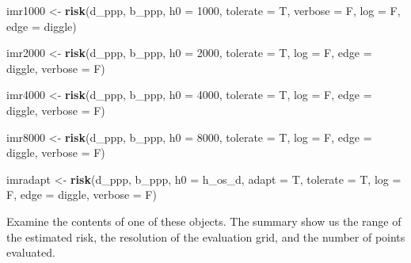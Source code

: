 \documentclass[
]{book}
\newenvironment{Shaded}{\begin{snugshade}}{\end{snugshade}}
\newcommand{\AttributeTok}[1]{\textcolor[rgb]{0.13,0.29,0.53}{#1}}
\newcommand{\DecValTok}[1]{\textcolor[rgb]{0.00,0.00,0.81}{#1}}
\newcommand{\FunctionTok}[1]{\textcolor[rgb]{0.13,0.29,0.53}{\textbf{#1}}}
\newcommand{\NormalTok}[1]{#1}
\newcommand{\OtherTok}[1]{\textcolor[rgb]{0.56,0.35,0.01}{#1}}
\newcommand{\StringTok}[1]{\textcolor[rgb]{0.31,0.60,0.02}{#1}}
\begin{document}
\begin{Shaded}
\begin{Highlighting}[]
\NormalTok{imr1000 }\OtherTok{\textless{}{-}} \FunctionTok{risk}\NormalTok{(d\_ppp, b\_ppp, }\AttributeTok{h0 =} \DecValTok{1000}\NormalTok{, }
            \AttributeTok{tolerate =}\NormalTok{ T,}
            \AttributeTok{verbose =}\NormalTok{ F, }
            \AttributeTok{log =}\NormalTok{ F,}
            \AttributeTok{edge =} \StringTok{\textquotesingle{}diggle\textquotesingle{}}\NormalTok{)}

\NormalTok{imr2000 }\OtherTok{\textless{}{-}} \FunctionTok{risk}\NormalTok{(d\_ppp, b\_ppp, }\AttributeTok{h0 =} \DecValTok{2000}\NormalTok{, }
            \AttributeTok{tolerate =}\NormalTok{ T,}
            \AttributeTok{log =}\NormalTok{ F,}
            \AttributeTok{edge =} \StringTok{\textquotesingle{}diggle\textquotesingle{}}\NormalTok{,}
            \AttributeTok{verbose =}\NormalTok{ F)}

\NormalTok{imr4000 }\OtherTok{\textless{}{-}} \FunctionTok{risk}\NormalTok{(d\_ppp, b\_ppp, }\AttributeTok{h0 =} \DecValTok{4000}\NormalTok{, }
            \AttributeTok{tolerate =}\NormalTok{ T,}
            \AttributeTok{log =}\NormalTok{ F,}
            \AttributeTok{edge =} \StringTok{\textquotesingle{}diggle\textquotesingle{}}\NormalTok{,}
            \AttributeTok{verbose =}\NormalTok{ F)}

\NormalTok{imr8000 }\OtherTok{\textless{}{-}} \FunctionTok{risk}\NormalTok{(d\_ppp, b\_ppp, }\AttributeTok{h0 =} \DecValTok{8000}\NormalTok{, }
            \AttributeTok{tolerate =}\NormalTok{ T,}
            \AttributeTok{log =}\NormalTok{ F,}
            \AttributeTok{edge =} \StringTok{\textquotesingle{}diggle\textquotesingle{}}\NormalTok{,}
            \AttributeTok{verbose =}\NormalTok{ F)}

\NormalTok{imradapt }\OtherTok{\textless{}{-}} \FunctionTok{risk}\NormalTok{(d\_ppp, b\_ppp, }
                 \AttributeTok{h0 =}\NormalTok{ h\_os\_d, }
                 \AttributeTok{adapt =}\NormalTok{ T, }
                 \AttributeTok{tolerate =}\NormalTok{ T,}
                 \AttributeTok{log =}\NormalTok{ F,}
                 \AttributeTok{edge =} \StringTok{\textquotesingle{}diggle\textquotesingle{}}\NormalTok{,}
                 \AttributeTok{verbose =}\NormalTok{ F)}
\end{Highlighting}
\end{Shaded}

Examine the contents of one of these objects. The summary show us the range of the estimated risk, the resolution of the evaluation grid, and the number of points evaluated.
\end{document}
